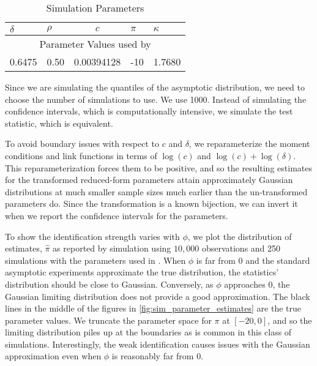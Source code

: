 \documentclass[11pt, letterpaper, twoside]{article}
\begin{document}
\begin{table}[htb]
 
 \centering
 \caption{Simulation Parameters}
 \label{tbl:simulationParameters}
 
 \begin{tabularx}{.65\textwidth}{X X c X X}

  \toprule
  $\delta$ & $\rho$ & $c$ & $\pi$ & $\kappa$ \\
  \midrule
  \multicolumn{5}{c}{Parameter Values used by \textcite{han2018leverage}} \\
  \midrule
  0.6475  & 0.50  & \num[scientific-notation=true]{.00394128} & -10 & 1.7680 \\
  \bottomrule
%
 \end{tabularx}

\end{table}


Since we are simulating the quantiles of the asymptotic distribution, we need to choose the number of simulations to use. We use \num{1000}. Instead of simulating the confidence intervals, which is computationally intensive, we simulate the test statistic, which is equivalent.   

To avoid boundary issues with respect to $c$ and $\delta$, we reparameterize the moment conditions and link functions in terms of $\log(c)$ and $\log(c) + \log(\delta)$. This reparameterization forces them to be positive, and so the resulting estimates for the transformed reduced-form parameters attain approximately Gaussian distributions at much smaller sample sizes much earlier than the un-transformed parameters do. Since the transformation is a known bijection, we can invert it when we report the confidence intervals for the parameters.

To show the identification strength varies with $\phi$, we plot the distribution of estimates, $\widehat{\pi}$ as reported by simulation using $10,000$ observations and \num{250} simulations with the parameters used in \textcite{han2018leverage}. When $\phi$ is far from $0$ and the standard asymptotic experiments approximate the true distribution, the statistics' distribution should be close to Gaussian. Conversely, as $\phi$ approaches $0$, the Gaussian limiting distribution does not provide a good approximation. The black lines in the middle of the figures in \cref{fig:sim_parameter_estimates} are the true parameter values. We truncate the parameter space for $\pi$ at $[-20, 0]$, and so the limiting distribution piles up at the boundaries as is common in this class of simulations. Interestingly, the weak identification causes issues with the Gaussian approximation even when $\phi$ is reasonably far from $0$. 
\end{document}
